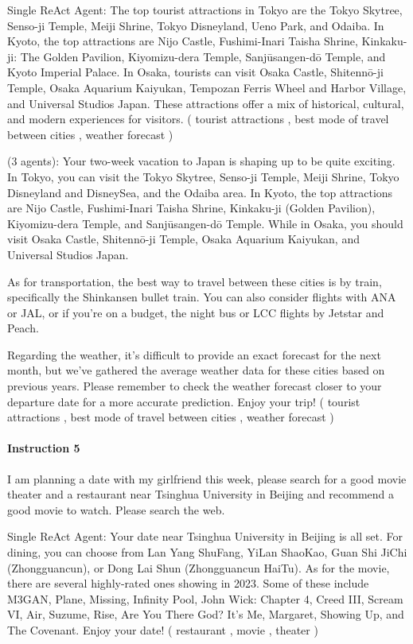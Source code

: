 {\color{blue} Single ReAct Agent}: The top tourist attractions in Tokyo are the Tokyo Skytree, Senso-ji Temple, Meiji Shrine, Tokyo Disneyland, Ueno Park, and Odaiba. In Kyoto, the top attractions are Nijo Castle, Fushimi-Inari Taisha Shrine, Kinkaku-ji: The Golden Pavilion, Kiyomizu-dera Temple, Sanjūsangen-dō Temple, and Kyoto Imperial Palace. In Osaka, tourists can visit Osaka Castle, Shitennō-ji Temple, Osaka Aquarium Kaiyukan, Tempozan Ferris Wheel and Harbor Village, and Universal Studios Japan. These attractions offer a mix of historical, cultural, and modern experiences for visitors. ({\color{teal} tourist attractions \cmark}, {\color{red} best mode of travel between cities \xmark}, {\color{red} weather forecast \xmark})

{\color{magenta} \framework (3 agents)}: Your two-week vacation to Japan is shaping up to be quite exciting. In Tokyo, you can visit the Tokyo Skytree, Senso-ji Temple, Meiji Shrine, Tokyo Disneyland and DisneySea, and the Odaiba area. In Kyoto, the top attractions are Nijo Castle, Fushimi-Inari Taisha Shrine, Kinkaku-ji (Golden Pavilion), Kiyomizu-dera Temple, and Sanjūsangen-dō Temple. While in Osaka, you should visit Osaka Castle, Shitennō-ji Temple, Osaka Aquarium Kaiyukan, and Universal Studios Japan.

As for transportation, the best way to travel between these cities is by train, specifically the Shinkansen bullet train. You can also consider flights with ANA or JAL, or if you're on a budget, the night bus or LCC flights by Jetstar and Peach.

Regarding the weather, it's difficult to provide an exact forecast for the next month, but we've gathered the average weather data for these cities based on previous years. Please remember to check the weather forecast closer to your departure date for a more accurate prediction. Enjoy your trip! ({\color{teal} tourist attractions \cmark}, {\color{teal} best mode of travel between cities \cmark}, {\color{teal} weather forecast \cmark})

\paragraph{Instruction 5} I am planning a date with my girlfriend this week, please search for a good movie theater and a restaurant near Tsinghua University in Beijing and recommend a good movie to watch. Please search the web.

{\color{blue} Single ReAct Agent}: Your date near Tsinghua University in Beijing is all set. For dining, you can choose from Lan Yang ShuFang, YiLan ShaoKao, Guan Shi JiChi (Zhongguancun), or Dong Lai Shun (Zhongguancun HaiTu). As for the movie, there are several highly-rated ones showing in 2023. Some of these include M3GAN, Plane, Missing, Infinity Pool, John Wick: Chapter 4, Creed III, Scream VI, Air, Suzume, Rise, Are You There God? It’s Me, Margaret, Showing Up, and The Covenant. Enjoy your date! ({\color{teal} restaurant \cmark}, {\color{teal} movie \cmark}, {\color{red} theater \xmark})

